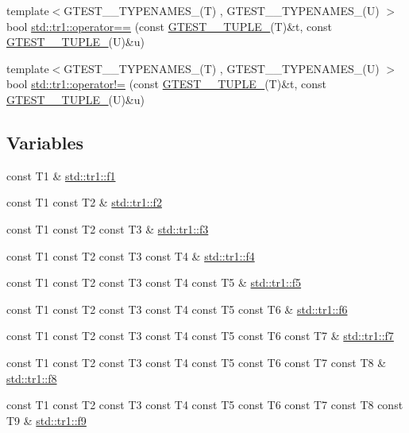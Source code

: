 \begin{DoxyCompactItemize}
\item 
{\footnotesize template$<$G\+T\+E\+S\+T\+\_\+\_\+\+T\+Y\+P\+E\+N\+A\+M\+E\+S\+\_\+(\+T) , G\+T\+E\+S\+T\+\_\+\_\+\+T\+Y\+P\+E\+N\+A\+M\+E\+S\+\_\+(\+U) $>$ }\\bool \mbox{\hyperlink{namespacestd_1_1tr1_af4516de784404381f9b14797694b6311}{std\+::tr1\+::operator==}} (const \mbox{\hyperlink{gtest-tuple_8h_a275e7bcd84299cc44b9c1dba971951c4}{G\+T\+E\+S\+T\+\_\+\_\+\+T\+U\+P\+L\+E\+\_\+}}(T)\&t, const \mbox{\hyperlink{gtest-tuple_8h_a275e7bcd84299cc44b9c1dba971951c4}{G\+T\+E\+S\+T\+\_\+\_\+\+T\+U\+P\+L\+E\+\_\+}}(U)\&u)
\item 
{\footnotesize template$<$G\+T\+E\+S\+T\+\_\+\_\+\+T\+Y\+P\+E\+N\+A\+M\+E\+S\+\_\+(\+T) , G\+T\+E\+S\+T\+\_\+\_\+\+T\+Y\+P\+E\+N\+A\+M\+E\+S\+\_\+(\+U) $>$ }\\bool \mbox{\hyperlink{namespacestd_1_1tr1_a058882c51de469b5e78d29076f864940}{std\+::tr1\+::operator!=}} (const \mbox{\hyperlink{gtest-tuple_8h_a275e7bcd84299cc44b9c1dba971951c4}{G\+T\+E\+S\+T\+\_\+\_\+\+T\+U\+P\+L\+E\+\_\+}}(T)\&t, const \mbox{\hyperlink{gtest-tuple_8h_a275e7bcd84299cc44b9c1dba971951c4}{G\+T\+E\+S\+T\+\_\+\_\+\+T\+U\+P\+L\+E\+\_\+}}(U)\&u)
\end{DoxyCompactItemize}
\subsection*{Variables}
\begin{DoxyCompactItemize}
\item 
const T1 \& \mbox{\hyperlink{namespacestd_1_1tr1_a9c0fa65b105f8e2f58ba59ecf75fd000}{std\+::tr1\+::f1}}
\item 
const T1 const T2 \& \mbox{\hyperlink{namespacestd_1_1tr1_a87dd9e009868361317f587126dba63d4}{std\+::tr1\+::f2}}
\item 
const T1 const T2 const T3 \& \mbox{\hyperlink{namespacestd_1_1tr1_a0f7c3b47d27d42d82d1a333ea420ce4e}{std\+::tr1\+::f3}}
\item 
const T1 const T2 const T3 const T4 \& \mbox{\hyperlink{namespacestd_1_1tr1_adc796e02b7385d526aff708189564f67}{std\+::tr1\+::f4}}
\item 
const T1 const T2 const T3 const T4 const T5 \& \mbox{\hyperlink{namespacestd_1_1tr1_a9c1eb66b2b2fa321942af95405232a0d}{std\+::tr1\+::f5}}
\item 
const T1 const T2 const T3 const T4 const T5 const T6 \& \mbox{\hyperlink{namespacestd_1_1tr1_a6b62f32e1e3e21bceb94eb46c4cbfd56}{std\+::tr1\+::f6}}
\item 
const T1 const T2 const T3 const T4 const T5 const T6 const T7 \& \mbox{\hyperlink{namespacestd_1_1tr1_a2185f3a1c07f2df072c39cb91ffa89a4}{std\+::tr1\+::f7}}
\item 
const T1 const T2 const T3 const T4 const T5 const T6 const T7 const T8 \& \mbox{\hyperlink{namespacestd_1_1tr1_ab998afa41cea8d6d26d7e4288b0bf974}{std\+::tr1\+::f8}}
\item 
const T1 const T2 const T3 const T4 const T5 const T6 const T7 const T8 const T9 \& \mbox{\hyperlink{namespacestd_1_1tr1_a216d2c7cdfaaf415caba2f88e2c34413}{std\+::tr1\+::f9}}
\end{DoxyCompactItemize}


